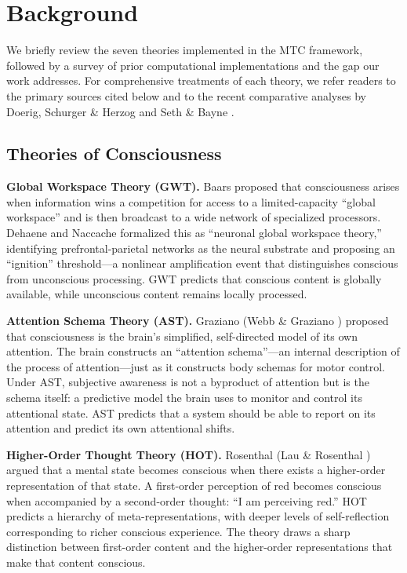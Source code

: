 \section{Background}
\label{sec:background}

We briefly review the seven theories implemented in the MTC framework, followed by a survey of prior computational implementations and the gap our work addresses. For comprehensive treatments of each theory, we refer readers to the primary sources cited below and to the recent comparative analyses by Doerig, Schurger \& Herzog \cite{doerig2020} and Seth \& Bayne \cite{seth2022}.

\subsection{Theories of Consciousness}

\textbf{Global Workspace Theory (GWT).} Baars \cite{baars1988} proposed that consciousness arises when information wins a competition for access to a limited-capacity ``global workspace'' and is then broadcast to a wide network of specialized processors. Dehaene and Naccache \cite{dehaene2001} formalized this as ``neuronal global workspace theory,'' identifying prefrontal-parietal networks as the neural substrate and proposing an ``ignition'' threshold---a nonlinear amplification event that distinguishes conscious from unconscious processing. GWT predicts that conscious content is globally available, while unconscious content remains locally processed.

\textbf{Attention Schema Theory (AST).} Graziano \cite{graziano2013} (Webb \& Graziano \cite{webb2015}) proposed that consciousness is the brain's simplified, self-directed model of its own attention. The brain constructs an ``attention schema''---an internal description of the process of attention---just as it constructs body schemas for motor control. Under AST, subjective awareness is not a byproduct of attention but is the schema itself: a predictive model the brain uses to monitor and control its attentional state. AST predicts that a system should be able to report on its attention and predict its own attentional shifts.

\textbf{Higher-Order Thought Theory (HOT).} Rosenthal \cite{rosenthal2005} (Lau \& Rosenthal \cite{lau2011}) argued that a mental state becomes conscious when there exists a higher-order representation of that state. A first-order perception of red becomes conscious when accompanied by a second-order thought: ``I am perceiving red.'' HOT predicts a hierarchy of meta-representations, with deeper levels of self-reflection corresponding to richer conscious experience. The theory draws a sharp distinction between first-order content and the higher-order representations that make that content conscious.

